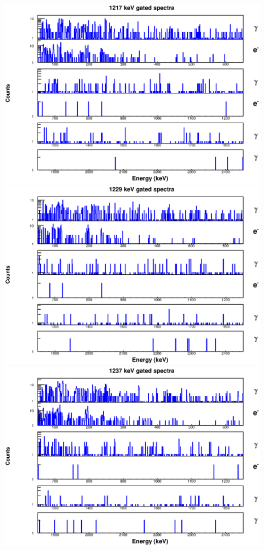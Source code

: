 \includegraphics[scale=0.8]{154Gd_Appendix/1217_combined.eps}
\includegraphics[scale=0.8]{154Gd_Appendix/1229_combined.eps}
\includegraphics[scale=0.8]{154Gd_Appendix/1237_combined.eps}
